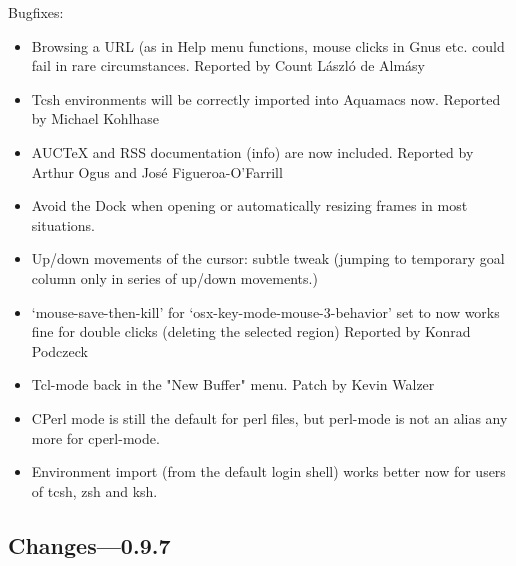 Bugfixes:

\begin{itemize}
\item Browsing a URL (as in Help menu functions, mouse clicks in Gnus
	etc. could fail in rare circumstances.
	Reported by Count László de Almásy

\item Tcsh environments will be correctly imported into Aquamacs now.
	Reported by Michael Kohlhase
	
\item AUCTeX and RSS documentation (info) are now included.
	Reported by Arthur Ogus and José Figueroa-O'Farrill
	
\item Avoid the Dock when opening or automatically resizing frames in
	most situations. 

\item Up/down movements of the cursor: subtle tweak (jumping to
	temporary goal column only in series of up/down movements.)

\item `mouse-save-then-kill' for `osx-key-mode-mouse-3-behavior' set
	to now works fine for double clicks (deleting the selected region)
	Reported by Konrad Podczeck
	
\item Tcl-mode back in the "New Buffer" menu.
	Patch by Kevin Walzer

\item CPerl mode is still the default for perl files, but perl-mode is
	not an alias any more for cperl-mode.
	
\item Environment import (from the default login shell) works better
	now for users of tcsh, zsh and ksh.
	


\end{itemize}

\subsection{Changes---0.9.7}

